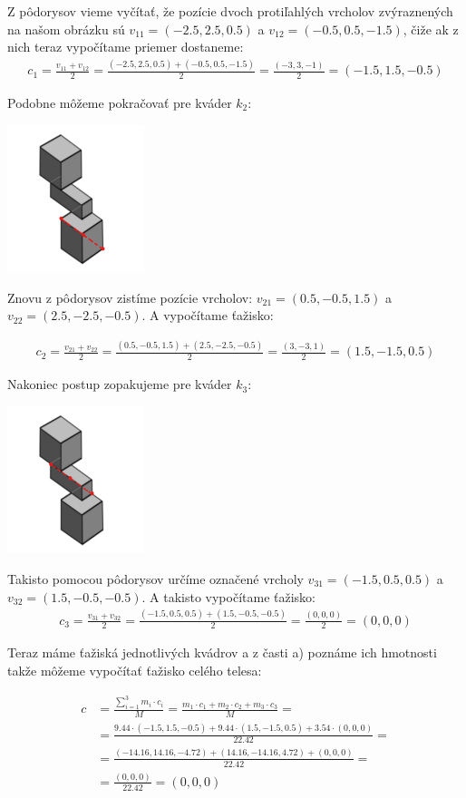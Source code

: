 \documentclass[a4paper]{article}
\begin{document}
	Z pôdorysov vieme vyčítať, že pozície dvoch protiľahlých vrcholov zvýraznených na našom obrázku sú $v_{11} = (-2.5, 2.5, 0.5)$ a $v_{12} = (-0.5, 0.5, -1.5)$, čiže ak z nich teraz vypočítame priemer dostaneme:
	\begin{align*}
		c_1 = \frac{v_{11} + v_{12}}{2} = \frac{(-2.5, 2.5, 0.5) + (-0.5, 0.5, -1.5)}{2} = \frac{(-3, 3, -1)}{2} = (-1.5, 1.5, -0.5)
	\end{align*}

	Podobne môžeme pokračovať pre kváder $k_2$:
	
	\centerline{\includegraphics[width=0.3\textwidth]{taz_k_3}}
	
	Znovu z pôdorysov zistíme pozície vrcholov: $v_{21} = (0.5, -0.5, 1.5)$ a $v_{22} = (2.5, -2.5, -0.5)$. A vypočítame ťažisko:
	
	\begin{align*}
		c_2 = \frac{v_{21} + v_{22}}{2} = \frac{(0.5, -0.5, 1.5) + (2.5, -2.5, -0.5)}{2} = \frac{(3, -3, 1)}{2} = (1.5, -1.5, 0.5)
	\end{align*}
	
	
	Nakoniec postup zopakujeme pre kváder $k_3$:
	
	\centerline{\includegraphics[width=0.3\textwidth]{taz_k_2}}
	
	Takisto pomocou pôdorysov určíme označené vrcholy $v_{31} = (-1.5, 0.5, 0.5)$ a $v_{32} = (1.5, -0.5, -0.5)$. A takisto vypočítame ťažisko:
	\begin{align*}
		c_3 = \frac{v_{31} + v_{32}}{2} = \frac{(-1.5, 0.5, 0.5) + (1.5, -0.5, -0.5)}{2} = \frac{(0, 0, 0)}{2} = (0, 0, 0)
	\end{align*}
	
	Teraz máme ťažiská jednotlivých kvádrov a z časti a) poznáme ich hmotnosti takže môžeme vypočítať ťažisko celého telesa:
	
	\begin{align*}
		c &= \frac{\sum_{i=1}^{3} m_i \cdot c_i}{M} 
		= \frac{m_1 \cdot c_1 + m_2 \cdot c_2 + m_3 \cdot c_3}{M} = 
		\\ 
		&= \frac{9.44 \cdot (-1.5, 1.5, -0.5) + 9.44 \cdot (1.5, -1.5, 0.5) + 3.54 \cdot (0, 0, 0)}{22.42}  =
		\\
		&= \frac{(-14.16, 14.16, -4.72) + (14.16, -14.16, 4.72) + (0, 0, 0)}{22.42} = 
		\\
		&= \frac{(0, 0, 0)}{22.42}
		= (0, 0, 0) 
	\end{align*}
\end{document}
